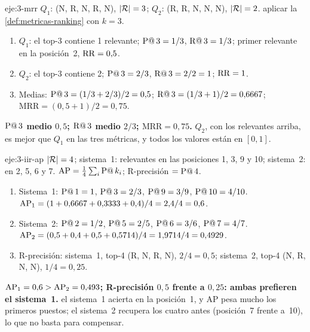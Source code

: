 \begin{solucion}{eje:3-mrr}
\datos $Q_1$: (N, R, N, R, N), $\lvert\mathcal{R}\rvert=3$; $Q_2$: (R, R, N, N, N), $\lvert\mathcal{R}\rvert=2$.
\planteamiento aplicar la \cref{def:metricas-ranking} con $k=3$.
\pasos
\begin{enumerate}[label=\arabic*.]
  \item $Q_1$: el top-3 contiene 1 relevante; $\operatorname{P@}3=1/3$, $\operatorname{R@}3=1/3$; primer relevante en la posición~2, $\operatorname{RR}=0{,}5$.
  \item $Q_2$: el top-3 contiene 2; $\operatorname{P@}3=2/3$, $\operatorname{R@}3=2/2=1$; $\operatorname{RR}=1$.
  \item Medias: $\operatorname{P@}3=(1/3+2/3)/2=0{,}5$; $\operatorname{R@}3=(1/3+1)/2=0{,}6667$; $\mathrm{MRR}=(0{,}5+1)/2=0{,}75$.
\end{enumerate}
\resultado \textbf{$\operatorname{P@}3$ medio $0{,}5$; $\operatorname{R@}3$ medio $2/3$; $\mathrm{MRR}=0{,}75$.}
\comprobacion $Q_2$, con los relevantes arriba, es mejor que $Q_1$ en las tres métricas, y todos los valores están en $[0,1]$.
\end{solucion}

\begin{solucion}{eje:3-iir-ap}
\datos $\lvert\mathcal{R}\rvert=4$; sistema~1: relevantes en las posiciones 1, 3, 9 y 10; sistema~2: en 2, 5, 6 y 7.
\planteamiento $\operatorname{AP}=\frac14\sum_i\operatorname{P@}k_i$; R-precisión $=\operatorname{P@}4$.
\pasos
\begin{enumerate}[label=\arabic*.]
  \item Sistema~1: $\operatorname{P@}1=1$, $\operatorname{P@}3=2/3$, $\operatorname{P@}9=3/9$, $\operatorname{P@}10=4/10$. $\operatorname{AP}_1=(1+0{,}6667+0{,}3333+0{,}4)/4=2{,}4/4=0{,}6$.
  \item Sistema~2: $\operatorname{P@}2=1/2$, $\operatorname{P@}5=2/5$, $\operatorname{P@}6=3/6$, $\operatorname{P@}7=4/7$. $\operatorname{AP}_2=(0{,}5+0{,}4+0{,}5+0{,}5714)/4=1{,}9714/4=0{,}4929$.
  \item R-precisión: sistema~1, top-4 (R, N, R, N), $2/4=0{,}5$; sistema~2, top-4 (N, R, N, N), $1/4=0{,}25$.
\end{enumerate}
\resultado \textbf{$\operatorname{AP}_1=0{,}6>\operatorname{AP}_2=0{,}493$; R-precisión $0{,}5$ frente a $0{,}25$: ambas prefieren el sistema~1.}
\comprobacion el sistema~1 acierta en la posición~1, y AP pesa mucho los primeros puestos; el sistema~2 recupera los cuatro antes (posición~7 frente a~10), lo que no basta para compensar.
\end{solucion}


